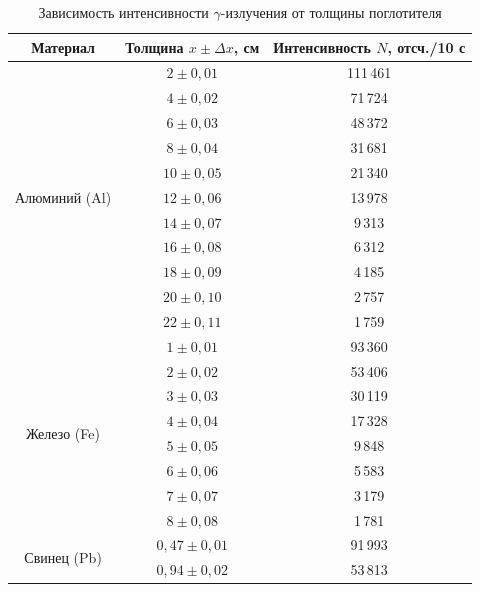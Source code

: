 \documentclass[12pt,a4paper]{article}
\begin{document}
\begin{table}[h!]
\centering
\caption{Зависимость интенсивности $\gamma$-излучения от толщины поглотителя}
\label{tab:attenuation_data}
\renewcommand{\arraystretch}{1.2}
\begin{tabular}{|c|c|c|}
\hline
\textbf{Материал} & \textbf{Толщина $x \pm \Delta x$, см} & \textbf{Интенсивность $N$, отсч./10 с} \\
\hline
\multirow{11}{*}{Алюминий (Al)} & $2 \pm 0{,}01$   & 111\,461 \\
                                & $4 \pm 0{,}02$   & 71\,724 \\
                                & $6 \pm 0{,}03$   & 48\,372 \\
                                & $8 \pm 0{,}04$   & 31\,681 \\
                                & $10 \pm 0{,}05$  & 21\,340 \\
                                & $12 \pm 0{,}06$  & 13\,978 \\
                                & $14 \pm 0{,}07$  & 9\,313 \\
                                & $16 \pm 0{,}08$  & 6\,312 \\
                                & $18 \pm 0{,}09$  & 4\,185 \\
                                & $20 \pm 0{,}10$  & 2\,757 \\
                                & $22 \pm 0{,}11$  & 1\,759 \\
\hline
\multirow{8}{*}{Железо (Fe)}    & $1 \pm 0{,}01$   & 93\,360 \\
                                & $2 \pm 0{,}02$   & 53\,406 \\
                                & $3 \pm 0{,}03$   & 30\,119 \\
                                & $4 \pm 0{,}04$   & 17\,328 \\
                                & $5 \pm 0{,}05$   & 9\,848 \\
                                & $6 \pm 0{,}06$   & 5\,583 \\
                                & $7 \pm 0{,}07$   & 3\,179 \\
                                & $8 \pm 0{,}08$   & 1\,781 \\
\hline
\multirow{6}{*}{Свинец (Pb)}    & $0{,}47 \pm 0{,}01$ & 91\,993 \\
                                & $0{,}94 \pm 0{,}02$ & 53\,813 \\

\end{tabular}
\end{table}
\end{document}
